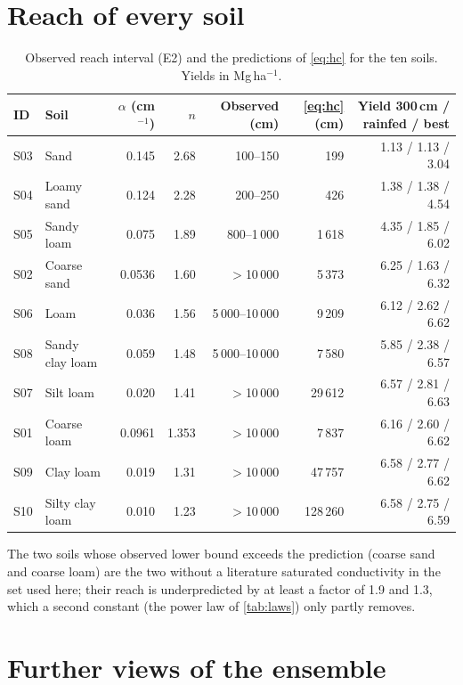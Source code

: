 \documentclass[preprint,12pt,authoryear]{elsarticle}
\begin{document}
\section{Reach of every soil}\label{app:reach}
\begin{table}[H]\centering\small
\caption{Observed reach interval (E2) and the predictions of \cref{eq:hc} for the ten soils. Yields in Mg\,ha$^{-1}$.}\label{tab:reachall}
\footnotesize\setlength{\tabcolsep}{4pt}
\begin{tabular}{@{}llrrrrr@{}}
\toprule
ID & Soil & $\alpha$ (cm$^{-1}$) & $n$ & Observed (cm) & \cref{eq:hc} (cm) & Yield 300\,cm / rainfed / best\\\midrule
S03 & Sand & 0.145 & 2.68 & 100--150 & 199 & 1.13 / 1.13 / 3.04\\
S04 & Loamy sand & 0.124 & 2.28 & 200--250 & 426 & 1.38 / 1.38 / 4.54\\
S05 & Sandy loam & 0.075 & 1.89 & 800--1\,000 & 1\,618 & 4.35 / 1.85 / 6.02\\
S02 & Coarse sand & 0.0536 & 1.60 & $>$10\,000 & 5\,373 & 6.25 / 1.63 / 6.32\\
S06 & Loam & 0.036 & 1.56 & 5\,000--10\,000 & 9\,209 & 6.12 / 2.62 / 6.62\\
S08 & Sandy clay loam & 0.059 & 1.48 & 5\,000--10\,000 & 7\,580 & 5.85 / 2.38 / 6.57\\
S07 & Silt loam & 0.020 & 1.41 & $>$10\,000 & 29\,612 & 6.57 / 2.81 / 6.63\\
S01 & Coarse loam & 0.0961 & 1.353 & $>$10\,000 & 7\,837 & 6.16 / 2.60 / 6.62\\
S09 & Clay loam & 0.019 & 1.31 & $>$10\,000 & 47\,757 & 6.58 / 2.77 / 6.62\\
S10 & Silty clay loam & 0.010 & 1.23 & $>$10\,000 & 128\,260 & 6.58 / 2.75 / 6.59\\\bottomrule
\end{tabular}
\end{table}
The two soils whose observed lower bound exceeds the prediction (coarse sand and coarse loam) are the two without a literature saturated conductivity in the set used here; their reach is underpredicted by at least a factor of 1.9 and 1.3, which a second constant (the power law of \cref{tab:laws}) only partly removes.

\section{Further views of the ensemble}\label{app:further}
\end{document}
